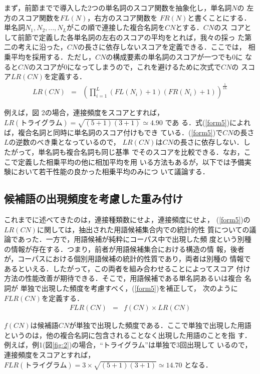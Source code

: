 まず，前節までで導入した2つの単名詞のスコア関数を抽象化し，単名詞$N$の
左方のスコア関数を$FL(N)$，右方のスコア関数を $FR(N)$と書くことにする．
単名詞$N_1,N_2,..., N_L$がこの順で連接した複合名詞を$CN$とする．$CN$のス
コアとして前節で定義した各単名詞の左右のスコアの平均をとれば，我々の採っ
た第二の考えに沿った，$CN$の長さに依存しないスコアを定義できる．ここでは，
相乗平均を採用する．ただし，$CN$の構成要素の単名詞のスコアが一つでも0に
なると$CN$のスコアが0になってしまうので，これを避けるために次式で$CN$の
スコア$LR(CN)$を定義する．
\begin{eqnarray}
LR(CN)&=&(\prod_{i=1}^L (FL(N_i)+1)(FR(N_i)+1))^{\frac{1}{2L}} \label{form5}
\end{eqnarray}

例えば，図 2の場合，連接頻度をスコアとすれば，$LR(トライグラム)= \sqrt{(5+1)(3+1)}\simeq4.90$ であ
る．式(\ref{form5})によれば，複合名詞と同時に単名詞のスコア付けもでき
ている．(\ref{form5})で$CN$の長さ$L$の逆数のべき乗となっているので，
$LR(CN)$は$CN$の長さに依存しない．したがって，単名詞も複合名詞も同じ基準
でそのスコアを比較できる．なお，ここで定義した相乗平均の他に相加平均を用
いる方法もあるが，以下では予備実験において若干性能の良かった相乗平均のみにつ
いて議論する．

\subsection{候補語の出現頻度を考慮した重み付け}\label{sec35}

これまでに述べてきたのは，連接種類数にせよ，連接頻度にせよ，
(\ref{form5})の$LR(CN)$に関しては，抽出された用語候補集合内での統計的性
質についての議論であった．一方で，用語候補が純粋にコーパス中で出現した頻
度という別種の情報が存在する．つまり，前者が用語候補集合における構造の情
報，後者が，コーパスにおける個別用語候補の統計的性質であり，両者は別種の
情報であるといえる．したがって，この両者を組み合わせることによってスコア
付け方法の性能改善が期待できる．そこで，用語候補である単名詞あるいは複合
名詞が
単独で出現した頻度を考慮すべく，(\ref{form5})を補正して，
次のように$FLR(CN)$を定義する．
\begin{eqnarray}
    FLR(CN) &=& f(CN) \times LR(CN) 
\end{eqnarray}

$f(CN)$は候補語$CN$が単独で出現した頻度である．ここで単独で出現した用語
というのは，他の複合名詞に包含されることなく出現した用語のことを指
す．例えば，例1(図\ref{fig:2})の場合，``トライグラム''は単独で3回出現して
いるので，連接頻度をスコアとすれば，$FLR(トライグラム)=3\times \sqrt{(5+1)(3+1)}\simeq14.70$ となる．

